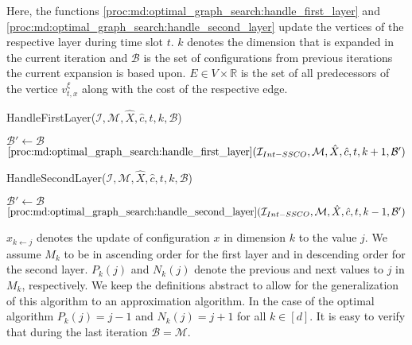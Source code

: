 Here, the functions \ref{proc:md:optimal_graph_search:handle_first_layer} and \ref{proc:md:optimal_graph_search:handle_second_layer} update the vertices of the respective layer during time slot $t$. $k$ denotes the dimension that is expanded in the current iteration and $\mathcal{B}$ is the set of configurations from previous iterations the current expansion is based upon. $E \in V \times \mathbb{R}$ is the set of all predecessors of the vertice $v_{t,x}^{\xi}$ along with the cost of the respective edge.

\begin{function}
	\caption{HandleFirstLayer($\mathcal{I}, \mathcal{M}, \hat{X}, \hat{c}, t, k, \mathcal{B}$)}\label{proc:md:optimal_graph_search:handle_first_layer}
	$\mathcal{B}' \gets \mathcal{B}$\;
    \Return $\text{\ref{proc:md:optimal_graph_search:handle_first_layer}}(\mathcal{I}_{Int-SSCO}, \mathcal{M}, \hat{X}, \hat{c}, t, k+1, \mathcal{B}')$\;
\end{function}

\begin{function}
	\caption{HandleSecondLayer($\mathcal{I}, \mathcal{M}, \hat{X}, \hat{c}, t, k, \mathcal{B}$)}\label{proc:md:optimal_graph_search:handle_second_layer}
	$\mathcal{B}' \gets \mathcal{B}$\;
    \Return $\text{\ref{proc:md:optimal_graph_search:handle_second_layer}}(\mathcal{I}_{Int-SSCO}, \mathcal{M}, \hat{X}, \hat{c}, t, k-1, \mathcal{B}')$\;
\end{function}

$x_{k \gets j}$ denotes the update of configuration $x$ in dimension $k$ to the value $j$. We assume $M_k$ to be in ascending order for the first layer and in descending order for the second layer. $P_k(j)$ and $N_k(j)$ denote the previous and next values to $j$ in $M_k$, respectively. We keep the definitions abstract to allow for the generalization of this algorithm to an approximation algorithm. In the case of the optimal algorithm $P_k(j) = j-1$ and $N_k(j) = j+1$ for all $k \in [d]$. It is easy to verify that during the last iteration $\mathcal{B} = \mathcal{M}$.

